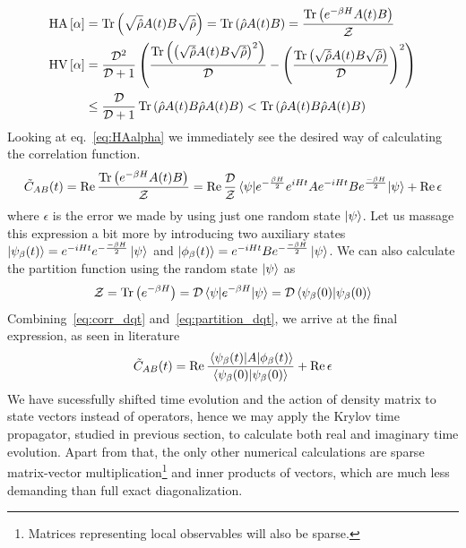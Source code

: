\begin{align}
	\mathrm{HA}\left[\alpha\right] &= \Tr\left(\sqrt{\hat{\rho}}A(t)B\sqrt{\hat{\rho}}\right) = \Tr\left(\hat{\rho}A(t)B\right) = \frac{\Tr\left(e^{-\beta H}A(t)B\right)}{\mathcal{Z}} \label{eq:HAalpha}\\
	\mathrm{HV}\left[\alpha\right] &= \frac{\mathcal{D}^2}{\mathcal{D} + 1}\left(
		\frac{\Tr\left(\left(\sqrt{\hat{\rho}}A(t)B\sqrt{\hat{\rho}}\right)^2\right)}{\mathcal{D}} - \left(\frac{\Tr\left(\sqrt{\hat{\rho}}A(t)B\sqrt{\hat{\rho}}\right)}{\mathcal{D}}\right)^2
	\right) \nonumber\\
	&\leq \frac{\mathcal{D}}{\mathcal{D}+1} \Tr\left(\hat{\rho}A(t)B \hat{\rho}A(t)B\right) < \Tr\left(\hat{\rho}A(t)B \hat{\rho}A(t)B\right)
	\label{eq:HValpha}
\end{align}
Looking at eq.~\eqref{eq:HAalpha} we immediately see the desired way of calculating the correlation function.
\begin{equation}
	\tilde{C}_{AB}(t) = \Re \frac{\Tr\left(e^{-\beta H}A(t)B\right)}{\mathcal{Z}} = \Re \frac{\dimension}{\mathcal{Z}} 
	\matrixel{\psi}{e^{-\frac{\beta H}{2}} e^{i H t}A e^{-i H t} Be^{\frac{-\beta H}{2}}}{\psi} + \Re \epsilon
	\label{eq:corr_dqt}
\end{equation}
where \(\epsilon\) is the error we made by using just one random state \(\ket{\psi}\). 
Let us massage this expression a bit more by introducing two auxiliary states 
\(\ket{\psi_{\beta}(t)} = e^{-i H t} e^{-\frac{-\beta H}{2}} \ket{\psi} \) and
\(\ket{\phi_{\beta}(t)} = e^{-i H t} B e^{-\frac{-\beta H}{2}} \ket{\psi} \). We can also
calculate the partition function using the random state \(\ket{\psi}\) as
\begin{equation}
	\mathcal{Z} = \Tr\left(e^{-\beta H}\right) = \dimension \matrixel{\psi}{e^{-\beta H}}{\psi} = 
	\dimension \braket{\psi_{\beta}(0)}{\psi_{\beta}(0)}
	\label{eq:partition_dqt}
\end{equation}
Combining~\eqref{eq:corr_dqt} and~\eqref{eq:partition_dqt}, we arrive at the final expression, as seen in literature~\autocite{Steinigeweg2014,Steinigeweg2015,Richter2019}
\begin{equation}
	\tilde{C}_{AB}(t) = \Re \frac{\matrixel{\psi_{\beta}(t)}{A}{\phi_{\beta}(t)}}{\braket{\psi_{\beta}(0)}{\psi_{\beta}(0)}} + \Re \epsilon
	\label{eq:corr_dqt_final}
\end{equation}
We have sucessfully shifted time evolution and the action of density matrix to state vectors instead of operators,
hence we may apply the Krylov time propagator, studied in previous section, to calculate both real and imaginary time
evolution. Apart from that, the only other numerical calculations are sparse matrix-vector multiplication\footnote{Matrices representing local observables will also be sparse.}
and inner products of vectors, which are much less demanding than full exact diagonalization. 

